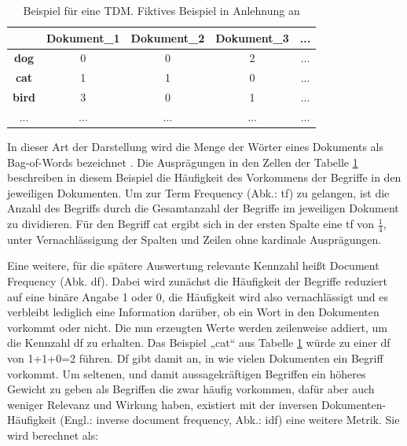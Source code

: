 \begin{table}[h]
\centering
\begin{tabular}{|c|c|c|c|c|}
\hline
\textbf{}     & \textbf{Dokument\_1} & \textbf{Dokument\_2} & \textbf{Dokument\_3} & \textbf{...} \\ \hline
\textbf{dog}  & 0                    & 0                    & 2                    & ...          \\ \hline
\textbf{cat}  & 1                    & 1                    & 0                    & ...          \\ \hline
\textbf{bird} & 3                    & 0                    & 1                    & ...          \\ \hline
...           & ...                  & ...                  & ...                  & ...          \\ \hline
\end{tabular}
\caption{Beispiel für eine TDM. Fiktives Beispiel in Anlehnung an \cite[S. 62]{Anandarajan}}
\label{tab:tdm}
\end{table}

In dieser Art der Darstellung wird die Menge der Wörter eines Dokuments als Bag-of-Words bezeichnet \cite[S. 46]{Anandarajan}. Die Ausprägungen in den Zellen der Tabelle \ref{tab:tdm} beschreiben in diesem Beispiel die Häufigkeit des Vorkommens der Begriffe in den jeweiligen Dokumenten. Um zur Term Frequency (Abk.: tf) zu gelangen, ist die Anzahl des Begriffs durch die Gesamtanzahl der Begriffe im jeweiligen Dokument zu dividieren. Für den Begriff cat ergibt sich in der ersten Spalte eine tf von \( \frac{1}{4} \), unter Vernachlässigung der Spalten und Zeilen ohne kardinale Ausprägungen.

Eine weitere, für die spätere Auswertung relevante Kennzahl heißt Document Frequency (Abk. df). Dabei wird zunächst die Häufigkeit der Begriffe reduziert auf eine binäre Angabe 1 oder 0, die Häufigkeit wird also vernachlässigt und es verbleibt lediglich eine Information darüber, ob ein Wort in den Dokumenten vorkommt oder nicht. Die nun erzeugten Werte werden zeilenweise addiert, um die Kennzahl df zu erhalten. Das Beispiel „cat“ aus Tabelle \ref{tab:tdm} würde zu einer df von 1+1+0=2 führen. Df gibt damit an, in wie vielen Dokumenten ein Begriff vorkommt. Um seltenen, und damit aussagekräftigen Begriffen ein höheres Gewicht zu geben als Begriffen die zwar häufig vorkommen, dafür aber auch weniger Relevanz und Wirkung haben, existiert mit der inversen Dokumenten-Häufigkeit (Engl.: inverse document frequency, Abk.: idf) eine weitere Metrik. Sie wird berechnet als:

